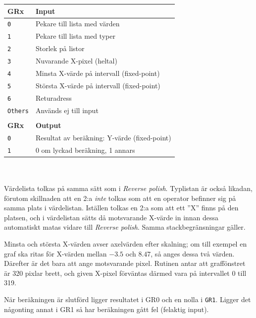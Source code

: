 \documentclass[]{article}
\begin{document}
\begin{tabular}{ll}
	\textbf{GRx}    & \textbf{Input}               \\ \hline
	\texttt{0}      & Pekare till lista med värden \\
	\texttt{1}      & Pekare till lista med typer  \\
	\texttt{2}      & Storlek på listor            \\
	\texttt{3}      & Nuvarande X-pixel (heltal)   \\
	\texttt{4}      & Minsta X-värde på intervall (fixed-point) \\
	\texttt{5}      & Största X-värde på intervall (fixed-point) \\
        \texttt{6}      & Returadress                  \\
        \texttt{Others} & Används ej till input        \\
                        &                              \\
	\textbf{GRx}    & \textbf{Output}              \\ \hline
	\texttt{0}      & Resultat av beräkning: Y-värde (fixed-point) \\
	\texttt{1}      & 0 om lyckad beräkning, 1 annars
\end{tabular}
\\\\
\noindent
Värdelista tolkas på samma sätt som i \textit{Reverse polish}. Typlistan är också likadan, förutom skillnaden att en 2:a \textit{inte} tolkas som att en operator befinner sig på samma plats i värdelistan. Iställen tolkas en 2:a som att ett ''X'' finns på den platsen, och i värdelistan sätts då motsvarande X-värde in innan dessa automatiskt matas vidare till \textit{Reverse polish}. Samma stackbegränsningar gäller.

Minsta och största X-värden avser axelvärden efter skalning; om till exempel en graf ska ritas för X-värden mellan $-3.5$ och $8.47$, så anges dessa två värden. Därefter är det bara att ange motsvarande pixel. Rutinen antar att graffönstret är 320 pixlar brett, och given X-pixel förväntas därmed vara på intervallet 0 till 319.

När beräkningen är slutförd ligger resultatet i GR0 och en nolla i \texttt{GR1}. Ligger det någonting annat i GR1 så har beräkningen gått fel (felaktig input).
\end{document}
